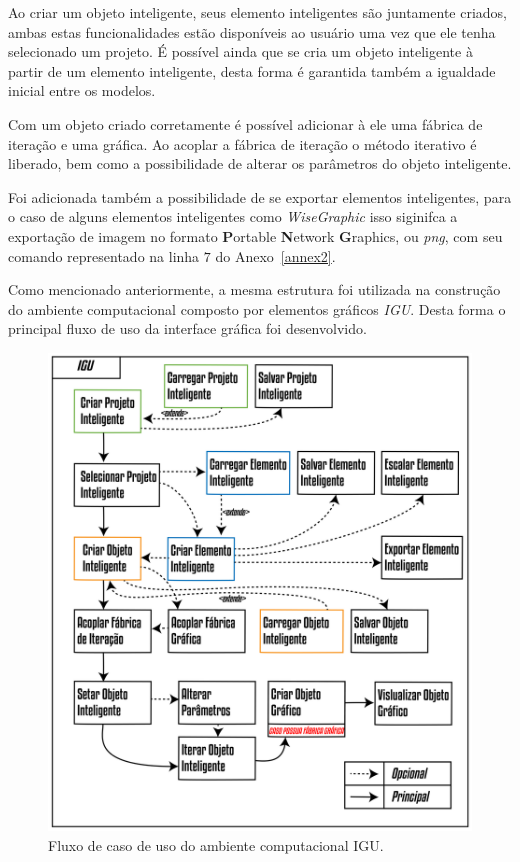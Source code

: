 \documentclass[a4paper,12pt]{monografia}
\theoremstyle{plain}
\theoremstyle{definition}
\theoremstyle{remark}
\begin{document}
Ao criar um objeto inteligente, seus elemento inteligentes são juntamente criados, ambas estas funcionalidades estão disponíveis ao usuário uma vez que ele tenha selecionado um projeto. É possível ainda que se cria um objeto inteligente à partir de um elemento inteligente, desta forma é garantida também a igualdade inicial entre os modelos.

Com um objeto criado corretamente é possível adicionar à ele uma fábrica de iteração e uma gráfica. Ao acoplar a fábrica de iteração o método iterativo é liberado, bem como a possibilidade de alterar os parâmetros do objeto inteligente.

Foi adicionada também a possibilidade de se exportar elementos inteligentes, para o caso de alguns elementos inteligentes como \textit{WiseGraphic} isso siginifca a exportação de imagem no formato \textbf{P}ortable \textbf{N}etwork \textbf{G}raphics, ou \textit{png}, com seu comando representado na linha $7$ do Anexo~\ref{annex2}.

Como mencionado anteriormente, a mesma estrutura foi utilizada na construção do ambiente computacional composto por elementos gráficos \textit{IGU}. Desta forma o principal fluxo de uso da interface gráfica foi desenvolvido.

\begin{figure}[!htbp]
	\centering
	\includegraphics[width=\linewidth]{Figures/CasoDeUso2@16x.png}
	\caption{Fluxo de caso de uso do ambiente computacional IGU.}
	\label{fig:caso_uso2}
\end{figure}
\end{document}
